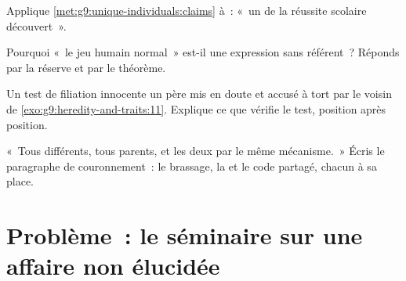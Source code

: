 \begin{exercise}[$\star\star$]\label{exo:g9:unique-individuals:9}
Applique \cref{met:g9:unique-individuals:claims} à~: «~un
 de la réussite scolaire découvert~».
\end{exercise}

\begin{exercise}[$\star\star$]\label{exo:g9:unique-individuals:10}
Pourquoi «~le jeu humain normal~» est-il une expression sans
référent~? Réponds par la réserve et par le théorème.
\end{exercise}

\begin{exercise}[$\star\star$]\label{exo:g9:unique-individuals:11}
Un test de filiation innocente un père mis en doute et
accusé à tort par le voisin de
\cref{exo:g9:heredity-and-traits:11}. Explique ce que
vérifie le test, position après position.
\end{exercise}

\begin{exercise}[$\star\star\star$]\label{exo:g9:unique-individuals:12}
«~Tous différents, tous parents, et les deux par le même
mécanisme.~» Écris le paragraphe de couronnement~: le
brassage, la  et le code partagé, chacun à sa place.
\end{exercise}

\section{Problème~: le séminaire sur une affaire non élucidée}

